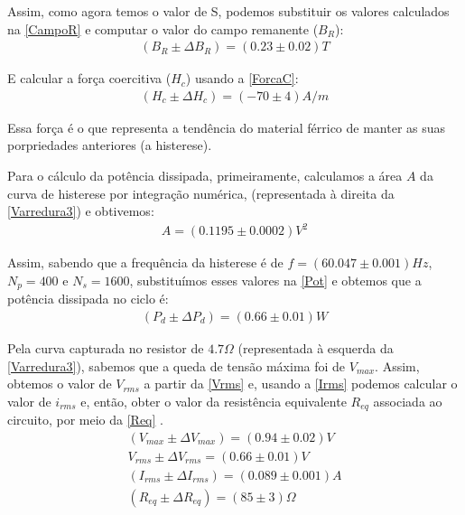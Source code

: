 \documentclass[11pt,a4paper]{article}
\begin{document}
    
    Assim, como agora temos o valor de S, podemos substituir os valores calculados na \cref{CampoR} e computar o valor do campo remanente ($B_R$):
    \begin{gather*}
        (B_R \pm \Delta B_R) = (0.23 \pm 0.02)T
    \end{gather*}
        
    E calcular a força coercitiva ($H_c$) usando a \cref{ForcaC}:
    \begin{gather*}
        (H_c \pm \Delta H_c) = (-70 \pm 4) A/m
    \end{gather*}
    
    Essa força é o que representa a tendência do material férrico de manter as suas porpriedades anteriores (a histerese).
    
    
    
    Para o cálculo da potência dissipada, primeiramente, calculamos a área $A$ da curva de histerese por integração numérica, (representada à direita da \cref{Varredura3}) e obtivemos:
    \begin{gather*}
        A = (0.1195 \pm 0.0002)V^2
    \end{gather*}
    
    Assim, sabendo que a frequência da histerese é de $ f = (60.047 \pm 0.001) Hz $, $N_p = 400$ e $N_s = 1600$, substituímos esses valores na \cref{Pot} e obtemos que a potência dissipada no ciclo é:
    \begin{gather*}
        (P_d \pm \Delta P_d) = (0.66 \pm 0.01)W
    \end{gather*}
    
    Pela curva capturada no resistor de $4.7 \Omega$ (representada à esquerda da \cref{Varredura3}), sabemos que a queda de tensão máxima foi de $V_{max}$. Assim, obtemos o valor de $V_{rms}$ a partir da \cref{Vrms} e, usando a \cref{Irms} podemos calcular o valor de $i_{rms}$ e, então, obter o valor da resistência equivalente $R_{eq}$ associada ao circuito, por meio da \cref{Req} .
    \begin{gather*}
        (V_{max} \pm \Delta V_{max}) = (0.94 \pm 0.02)V\\
        V_{rms} \pm \Delta V_{rms} = (0.66 \pm 0.01)V\\
        (I_{rms} \pm \Delta I_{rms}) = (0.089 \pm 0.001) A\\
        (R_{eq} \pm \Delta R_{eq}) = (85 \pm 3)\Omega
    \end{gather*}
\end{document}
